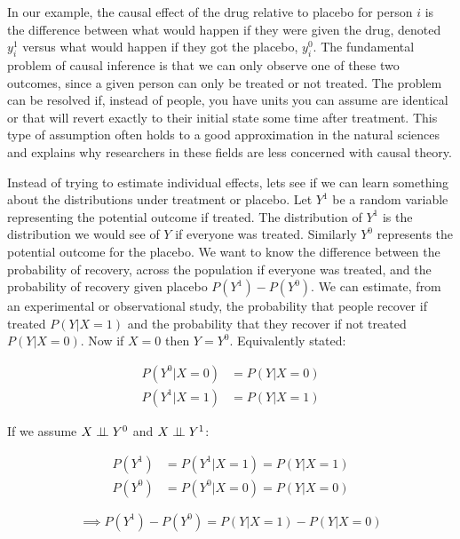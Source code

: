 \documentclass[11pt,a4paper]{article}
\begin{document}
In our example, the causal effect of the drug relative to placebo for person $i$ is the difference between what would happen if they were given the drug, denoted $y_{i}^{1}$ versus what would happen if they got the placebo, $y_{i}^{0}$. The fundamental problem of causal inference is that we can only observe one of these two outcomes, since a given person can only be treated or not treated. The problem can be resolved if, instead of people, you have units you can assume are identical or that will revert exactly to their initial state some time after treatment. This type of assumption often holds to a good approximation in the natural sciences and explains why researchers in these fields are less concerned with causal theory. 

Instead of trying to estimate individual effects, lets see if we can learn something about the distributions under treatment or placebo.  Let $Y^{1}$ be a random variable representing the potential outcome if treated. The distribution of $Y^{1}$ is the distribution we would see of $Y$ if everyone was treated. Similarly $Y^{0}$ represents the potential outcome for the placebo. We want to know the difference between the probability of recovery, across the population if everyone was treated, and the probability of recovery given placebo  $P(Y^{1})-P(Y^{0})$. We can estimate, from an experimental or observational study, the probability that people recover if treated $P(Y|X=1)$ and the probability that they recover if not treated $P(Y|X=0)$. Now if $X=0$ then $Y = Y^{0}$. Equivalently stated:

\begin{equation}
\begin{aligned}
P(Y^{0}|X=0)&= P(Y|X=0)\\
P(Y^{1}|X=1)&=P(Y|X=1)
\end{aligned}
\end{equation}

If we assume $X \perp\!\!\!\perp Y^{0}$ and $X \perp\!\!\!\perp Y^{1}$:

\begin{equation}
\begin{aligned}
P(Y^{1}) &= P(Y^{1}|X=1) = P(Y|X=1) \\
P(Y^{0}) &= P(Y^{0}|X=0) = P(Y|X=0) 
\end{aligned}
\end{equation}

\begin{equation}
\implies P(Y^{1})-P(Y^{0}) = P(Y|X=1) - P(Y|X=0)
\end{equation}
\end{document}
